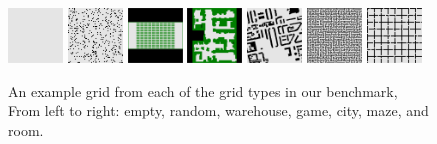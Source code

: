 \documentclass[letterpaper]{article} %
\newcommand{\Omri}[1]{}
\newcommand{\Carmel}[1]{}
\begin{document}
\begin{figure}
    \centering
    \includegraphics[width=0.13\textwidth]{Images/empty-16-16.pdf}\enspace
    \includegraphics[width=0.13\textwidth]{Images/random-64-64-10.pdf}\enspace
    \includegraphics[width=0.13\textwidth]{Images/warehouse-10-20-10-2-2.pdf}\enspace
    \includegraphics[width=0.13\textwidth]{Images/game-den312d.pdf}\enspace
    \includegraphics[width=0.13\textwidth]{Images/city-Berlin_1_256.pdf}\enspace
    \includegraphics[width=0.13\textwidth]{Images/maze-128-128-2.pdf}\enspace
    \includegraphics[width=0.13\textwidth]{Images/room-64-64-8.pdf}    
    \caption{An example grid from each of the grid types in our benchmark, From left to right: empty, random, warehouse, game, city, maze, and room.}
    \label{fig:grid-types}
\end{figure}


\end{document}
